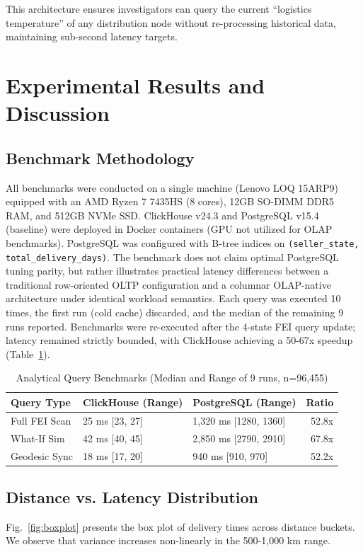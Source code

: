\documentclass[conference]{IEEEtran}
\begin{document}
This architecture ensures investigators can query the current ``logistics temperature'' of any distribution node without re-processing historical data, maintaining sub-second latency targets.

\section{Experimental Results and Discussion}
\label{sec:results}

\subsection{Benchmark Methodology}
All benchmarks were conducted on a single machine (Lenovo LOQ 15ARP9) equipped with an AMD Ryzen 7 7435HS (8 cores), 12GB SO-DIMM DDR5 RAM, and 512GB NVMe SSD. ClickHouse v24.3 and PostgreSQL v15.4 (baseline) were deployed in Docker containers (GPU not utilized for OLAP benchmarks). PostgreSQL was configured with B-tree indices on \texttt{(seller\_state, total\_delivery\_days)}. The benchmark does not claim optimal PostgreSQL tuning parity, but rather illustrates practical latency differences between a traditional row-oriented OLTP configuration and a columnar OLAP-native architecture under identical workload semantics. Each query was executed 10 times, the first run (cold cache) discarded, and the median of the remaining 9 runs reported. Benchmarks were re-executed after the 4-state FEI query update; latency remained strictly bounded, with ClickHouse achieving a 50-67x speedup (Table~\ref{tab:benchmarks}).

\begin{table}[htbp]
\centering
\caption{Analytical Query Benchmarks (Median and Range of 9 runs, n=96,455)}
\label{tab:benchmarks}
\begin{tabularx}{\columnwidth}{lXXr}
\toprule
\textbf{Query Type} & \textbf{ClickHouse (Range)} & \textbf{PostgreSQL (Range)} & \textbf{Ratio} \\
\midrule
Full FEI Scan & 25 ms [23, 27] & 1,320 ms [1280, 1360] & 52.8x \\
What-If Sim & 42 ms [40, 45] & 2,850 ms [2790, 2910] & 67.8x \\
Geodesic Sync & 18 ms [17, 20] & 940 ms [910, 970] & 52.2x \\
\bottomrule
\end{tabularx}
\end{table}

\subsection{Distance vs. Latency Distribution}
Fig.~\ref{fig:boxplot} presents the box plot of delivery times across distance buckets. We observe that variance increases non-linearly in the 500-1,000 km range.
\end{document}
